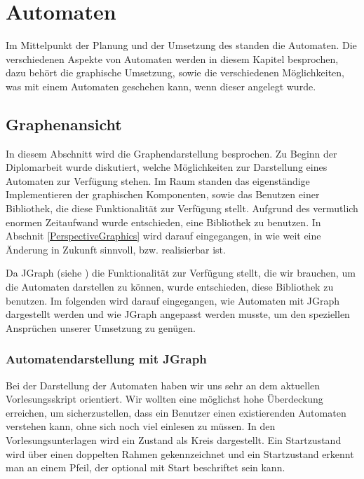 

\chapter{Automaten}\label{Machines}

Im Mittelpunkt der Planung und der Umsetzung des \gtitools standen die
Automaten. Die verschiedenen Aspekte von Automaten werden in diesem Kapitel
besprochen, dazu behört die graphische Umsetzung, sowie die verschiedenen
Möglichkeiten, was mit einem Automaten geschehen kann, wenn dieser angelegt
wurde.


\section{Graphenansicht}\label{Graph}

In diesem Abschnitt wird die Graphendarstellung besprochen. Zu Beginn der
Diplomarbeit wurde diskutiert, welche Möglichkeiten zur Darstellung eines
Automaten zur Verfügung stehen. Im Raum standen das eigenständige
Implementieren der graphischen Komponenten, sowie das Benutzen einer
Bibliothek, die diese Funktionalität zur Verfügung stellt. Aufgrund des
vermutlich enormen Zeitaufwand wurde entschieden, eine Bibliothek zu benutzen.
In Abschnit \ref{PerspectiveGraphics} wird darauf eingegangen, in wie weit eine
Änderung in Zukunft sinnvoll, bzw. realisierbar ist.\vspace{10pt} 

Da JGraph (siehe ) die Funktionalität zur Verfügung stellt, die
wir brauchen, um die Automaten darstellen zu können, wurde entschieden, diese
Bibliothek zu benutzen. Im folgenden wird darauf eingegangen, wie Automaten mit
JGraph dargestellt werden und wie JGraph angepasst werden musste, um den
speziellen Ansprüchen unserer Umsetzung zu genügen.


\subsection{Automatendarstellung mit JGraph}\label{GraphJGraph}

Bei der Darstellung der Automaten haben wir uns sehr an dem aktuellen
Vorlesungsskript orientiert. Wir wollten eine möglichst hohe Überdeckung
erreichen, um sicherzustellen, dass ein Benutzer einen existierenden Automaten
verstehen kann, ohne sich noch viel einlesen zu müssen. In den
Vorlesungsunterlagen wird ein Zustand als Kreis dargestellt. Ein Startzustand
wird über einen doppelten Rahmen gekennzeichnet und ein Startzustand erkennt man
an einem Pfeil, der optional mit Start beschriftet sein kann.\vspace{10pt}

